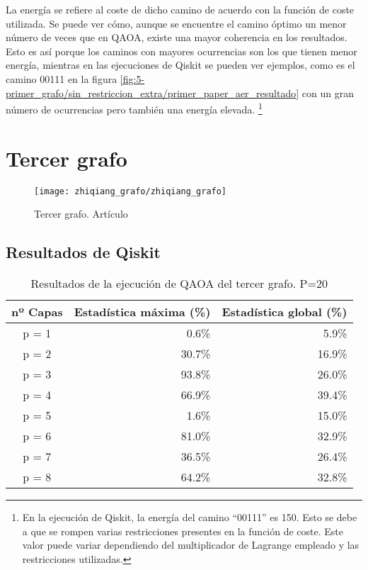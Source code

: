 \documentclass{article}
\begin{document}
La energía se refiere al coste de dicho camino de acuerdo con la función de coste utilizada. Se puede ver cómo, aunque se encuentre el camino óptimo un menor número de veces que en QAOA, existe una mayor coherencia en los resultados. Esto es así porque los caminos con mayores ocurrencias son los que tienen menor energía, mientras en las ejecuciones de Qiskit se pueden ver ejemplos, como es el camino 00111 en la figura \ref{fig:5-primer_grafo/sin_restriccion_extra/primer_paper_aer_resultado} con un gran número de ocurrencias pero también una energía elevada.
\footnote{En la ejecución de Qiskit, la energía del camino ``00111'' es 150. Esto se debe a que se rompen varias restricciones presentes en la función de coste. Este valor puede variar dependiendo del multiplicador de Lagrange empleado
  y las restricciones utilizadas.}

\section{Tercer grafo}

\begin{figure}[htbp]
  \centering
  \texttt{[image: zhiqiang\_grafo/zhiqiang\_grafo]}
  \caption{Tercer grafo. Artículo \cite{solving_shortest_path_with_qaoa}}
\end{figure}

\subsection{Resultados de Qiskit}
\begin{table}[htbp]
  \centering
  \begin{tabular}{|c|r|r|}
    \hline
    \textbf{nº Capas} & \textbf{Estadística máxima (\%)} & \textbf{Estadística global (\%)} \\ \hline
    p = 1 &  0.6\% &  5.9\% \\ \hline
    p = 2 & 30.7\% & 16.9\% \\ \hline
    p = 3 & 93.8\% & 26.0\% \\ \hline
    p = 4 & 66.9\% & 39.4\% \\ \hline  %
    p = 5 &  1.6\% & 15.0\% \\ \hline  %
    p = 6 & 81.0\% & 32.9\% \\ \hline
    p = 7 & 36.5\% & 26.4\% \\ \hline
    p = 8 & 64.2\% & 32.8\% \\ \hline
  \end{tabular}
  \caption{Resultados de la ejecución de QAOA del tercer grafo. P=20}
\end{table}
\end{document}
